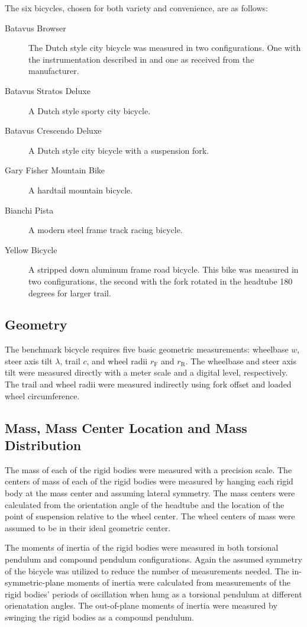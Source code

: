 \documentclass{bmd2010a}
\begin{document}
The six bicycles, chosen for both variety and convenience, are as follows:
\begin{description}
    \item[Batavus Browser] The Dutch style city bicycle was measured
        in two configurations. One with the instrumentation described in
        \cite{Kooijman2009a} and one as received from the manufacturer.
    \item[Batavus Stratos Deluxe] A Dutch style sporty city bicycle.
    \item[Batavus Crescendo Deluxe] A Dutch style city bicycle with a
        suspension fork.
    \item[Gary Fisher Mountain Bike] A hardtail mountain bicycle.
    \item[Bianchi Pista] A modern steel frame track racing bicycle.
    \item[Yellow Bicycle] A stripped down aluminum frame road bicycle. This
        bike was measured in two configurations, the second with the fork
        rotated in the headtube 180 degrees for larger trail.
\end{description}
\subsection*{Geometry}
The benchmark bicycle requires five basic geometric measurements: wheelbase
$w$, steer axis tilt $\lambda$, trail $c$, and wheel radii $r_\mathrm{F}$
and $r_\mathrm{R}$. The wheelbase and steer axis tilt were measured directly
with a meter scale and a digital level, respectively. The trail and wheel radii were
measured indirectly using fork offset and loaded wheel circumference.
\subsection*{Mass, Mass Center Location and Mass Distribution}
The mass of each of the rigid bodies were measured with a precision scale.
The centers of mass of each of the rigid bodies were measured by hanging each
rigid body at the mass center and assuming lateral symmetry. The mass centers
were calculated from the orientation angle of the headtube and the location of
the point of suspension relative to the wheel center.
The wheel centers of mass were assumed to be in their ideal
geometric center.

The moments of inertia of the rigid bodies were measured in both torsional
pendulum and compound pendulum configurations. Again the assumed symmetry of the
bicycle was utilized to reduce the number of measurements needed. The
in-symmetric-plane moments of inertia were calculated from measurements of the
rigid bodies' periods of oscillation when hung as a torsional pendulum at
different orienatation angles. The out-of-plane moments of inertia were
measured by swinging the rigid bodies as a compound pendulum.
\end{document}
